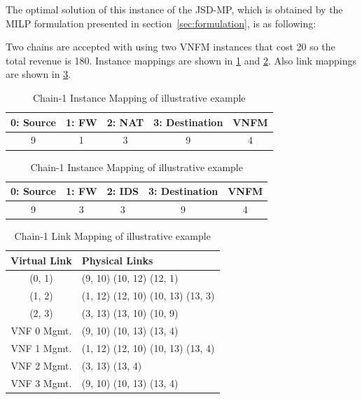 The optimal solution of this instance of the JSD-MP, which is obtained by the MILP formulation presented in section~\ref{sec:formulation}, is as following:

Two chains are accepted with using two VNFM instances that cost 20 so the total revenue is 180.
Instance mappings are shown in \ref{tbl:example-chain-1-mapping} and \ref{tbl:example-chain-2-mapping}.
Also link mappings are shown in \ref{tbl:example-chain-1-links}.

\begin{table}
    \centering
    \caption{Chain-1 Instance Mapping of illustrative example}
    \begin{tabular}{|c|c|c|c|c|}
        \hline
        0: Source & 1: FW & 2: NAT & 3: Destination & VNFM \\
        \hline
        9 & 1 & 3 & 9 & 4 \\
        \hline
    \end{tabular}
    \label{tbl:example-chain-1-mapping}
\end{table}

\begin{table}
    \centering
    \caption{Chain-1 Instance Mapping of illustrative example}
    \begin{tabular}{|c|c|c|c|c|}
        \hline
        0: Source & 1: FW & 2: IDS & 3: Destination & VNFM \\
        \hline
        9 & 3 & 3 & 9 & 4 \\
        \hline
    \end{tabular}
    \label{tbl:example-chain-2-mapping}
\end{table}

\begin{table}
    \centering
    \caption{Chain-1 Link Mapping of illustrative example}
    \begin{tabular}{|c|l|}
        \hline
        Virtual Link & Physical Links \\
        \hline
        (0, 1) & (9, 10) (10, 12) (12, 1) \\
        \hline
        (1, 2) & (1, 12) (12, 10) (10, 13) (13, 3) \\
        \hline
        (2, 3) & (3, 13) (13, 10) (10, 9) \\
        \hline
        VNF 0 Mgmt. & (9, 10) (10, 13) (13, 4) \\
        \hline
        VNF 1 Mgmt. & (1, 12) (12, 10) (10, 13) (13, 4) \\
        \hline
        VNF 2 Mgmt. & (3, 13) (13, 4) \\
        \hline
        VNF 3 Mgmt. & (9, 10) (10, 13) (13, 4) \\
        \hline
    \end{tabular}
    \label{tbl:example-chain-1-links}
\end{table}

